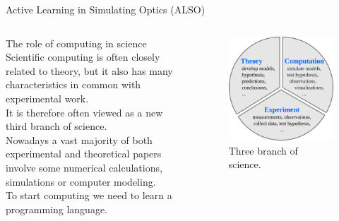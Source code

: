 \documentclass[serif ,mathserif, 8pt]{beamer}
\begin{document}
\begin{frame}{Active Learning in Simulating Optics (ALSO)}
\begin{columns}[c]
	\begin{column}{0.6\textwidth}
	\begin{block}{The role of computing in science}
			Scientific computing is often closely related to theory, but it also has many characteristics in common with experimental work.\\
		It is therefore often viewed as a new third branch of science.\\
		
		Nowadays a vast majority of both experimental and theoretical papers involve some numerical calculations, simulations or computer modeling.\\
		To start computing we need to learn a programming language.\\
	\end{block}

	
		
	\end{column}
	\begin{column}{0.4\textwidth}
		\begin{figure}
			\includegraphics[width=\linewidth]{images/theory-experiment-computation}
			\caption{Three branch of science.}
		\end{figure}
	\end{column}
\end{columns}

\end{frame}
\end{document}

